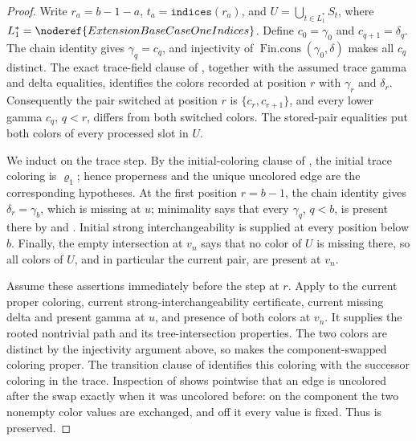 \begin{proof}
Write \(r_a=b-1-a\), \(t_a=\mathtt{indices}(r_a)\), and
\(U=\bigcup_{t\in L_1^*}S_t\), where
\(L_1^*=\noderef{ExtensionBaseCaseOneIndices}\).  Define
\(c_0=\gamma_0\) and \(c_{q+1}=\delta_q\).  The chain identity gives
\(\gamma_q=c_q\), and injectivity of
\(\operatorname{Fin.cons}(\gamma_0,\delta)\) makes all \(c_q\) distinct.
The exact trace-field clause of
, together with the assumed trace
gamma and delta equalities, identifies the colors recorded at position
\(r\) with \(\gamma_r\) and \(\delta_r\).  Consequently the pair switched
at position \(r\) is
\(\{c_r,c_{r+1}\}\), and every lower gamma \(c_q\), \(q<r\), differs from
both switched colors.  The stored-pair equalities put both colors of every
processed slot in \(U\).

We induct on the trace step.  By the initial-coloring clause of
, the initial trace coloring is
\(\varrho_1\); hence properness and the unique uncolored edge are the
corresponding hypotheses.  At the first position \(r=b-1\), the chain
identity gives \(\delta_r=\gamma_b\), which is missing at \(u\); minimality
says that every \(\gamma_q\), \(q<b\), is present there by
 and .  Initial strong
interchangeability is supplied at every position below \(b\).  Finally,
the empty intersection at \(v_n\) says that no color of \(U\) is missing
there, so all colors of \(U\), and in particular the current pair, are
present at \(v_n\).

Assume these assertions immediately before the step at \(r\).  Apply
 to the current proper coloring,
current strong-interchangeability certificate, current missing delta and
present gamma at \(u\), and presence of both colors at \(v_n\).  It supplies
the rooted nontrivial path and its tree-intersection properties.  The two
colors are distinct by the injectivity argument above, so
 makes the component-swapped coloring
proper.  The transition clause of 
identifies this coloring with the successor coloring in the trace.
Inspection of  shows pointwise that an edge
is uncolored after the swap exactly when it was uncolored before: on the
component the two nonempty color values are exchanged, and off it every
value is fixed.  Thus  is preserved.


\end{proof}
